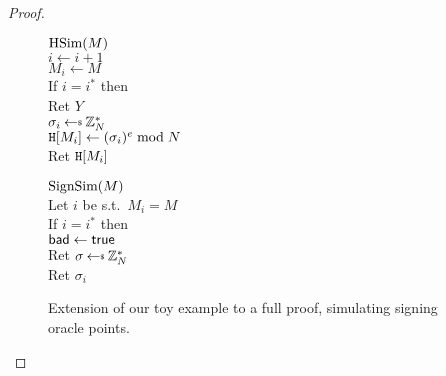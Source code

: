 \begin{proof}
\begin{figure}
{\underline{$\textnormal{HSim}(M)$}\\
$i \gets i+1$\\
$M_i \gets M$\\
If $i = i^*$ then\\
\myInd Ret $Y$\\
$\sigma_i \getsr \Z_N^*$\\
$\mathtt{H}[M_i] \gets (\sigma_i)^e \bmod N$\\
Ret $\mathtt{H}[M_i]$\medskip

\underline{$\textnormal{SignSim}(M)$}\\
Let $i$ be s.t.~$M_i = M$\\
If $i = i^*$ then\\
\myInd $\mathsf{bad}\gets\mathsf{true}$\\
\myInd Ret $\sigma \getsr \Z_N^*$\\
Ret $\sigma_i$
}

  \caption{Extension of our toy example to a full proof, simulating signing oracle points.}
\label{fig:fulldomainsignproof}
\end{figure}

\end{proof}

